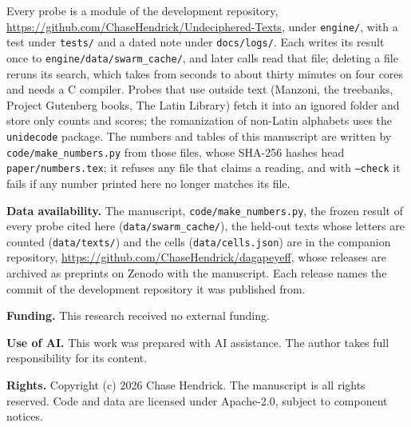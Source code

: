 \documentclass[11pt]{article}
\theoremstyle{definition}
\begin{document}
Every probe is a module of the development repository, \url{https://github.com/ChaseHendrick/Undeciphered-Texts}, under \texttt{engine/}, with a test under \texttt{tests/} and a dated note under \texttt{docs/logs/}. Each writes its result once to \texttt{engine/data/swarm\_cache/}, and later calls read that file; deleting a file reruns its search, which takes from seconds to about thirty minutes on four cores and needs a C compiler. Probes that use outside text (Manzoni, the treebanks, Project Gutenberg books, The Latin Library) fetch it into an ignored folder and store only counts and scores; the romanization of non-Latin alphabets uses the \texttt{unidecode} package. The numbers and tables of this manuscript are written by \texttt{code/make\_numbers.py} from those files, whose SHA-256 hashes head \texttt{paper/numbers.tex}; it refuses any file that claims a reading, and with \texttt{--check} it fails if any number printed here no longer matches its file.

{\raggedright\noindent\textbf{Data availability.} The manuscript, \texttt{code/make\_numbers.py}, the frozen result of every probe cited here (\texttt{data/swarm\_cache/}), the held-out texts whose letters are counted (\texttt{data/texts/}) and the cells (\texttt{data/cells.json}) are in the companion repository, \url{https://github.com/ChaseHendrick/dagapeyeff}, whose releases are archived as preprints on Zenodo with the manuscript. Each release names the commit of the development repository it was published from.\par}

\noindent\textbf{Funding.} This research received no external funding.

\noindent\textbf{Use of AI.} This work was prepared with AI assistance. The author takes full responsibility for its content.

{\raggedright\noindent\textbf{Rights.} Copyright (c) 2026 Chase Hendrick. The manuscript is all rights reserved. Code and data are licensed under Apache-2.0, subject to component notices.\par}



\end{document}
